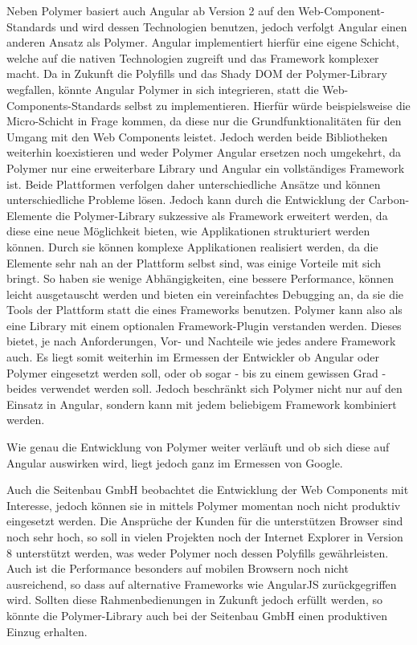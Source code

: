 Neben Polymer basiert auch Angular ab Version 2 auf den Web-Component-Stan\-dards und wird dessen Technologien benutzen, jedoch verfolgt Angular einen anderen Ansatz als Polymer. Angular implementiert hierfür eine eigene Schicht, welche auf die nativen Technologien zugreift und das Framework komplexer macht. Da in Zukunft die Polyfills und das Shady \ac{DOM} der Polymer-Library wegfallen, könnte Angular Polymer in sich integrieren, statt die Web-Components-Standards selbst zu implementieren. Hierfür würde beispielsweise die Micro-Schicht in Frage kommen, da diese nur die Grundfunktionalitäten für den Umgang mit den Web Components leistet. Jedoch werden beide Bibliotheken weiterhin koexistieren und weder Polymer Angular ersetzen noch umgekehrt, da Polymer nur eine erweiterbare Library und Angular ein vollständiges Framework ist. Beide Plattformen verfolgen daher unterschiedliche Ansätze und können unterschiedliche Probleme lösen. Jedoch kann durch die Entwicklung der Carbon-Elemente die Polymer-Library sukzessive als Framework erweitert werden, da diese eine neue Möglichkeit bieten, wie Applikationen strukturiert werden können. Durch sie können komplexe Applikationen realisiert werden, da die Elemente sehr nah an der Plattform selbst sind, was einige Vorteile mit sich bringt. So haben sie wenige Abhängigkeiten, eine bessere Performance, können leicht ausgetauscht werden und bieten ein vereinfachtes Debugging an, da sie die Tools der Plattform statt die eines Frameworks benutzen. Polymer kann also als eine Library mit einem optionalen Framework-Plugin verstanden werden. Dieses bietet, je nach Anforderungen, Vor- und Nachteile wie jedes andere Framework auch. Es liegt somit weiterhin im Ermessen der Entwickler ob Angular oder Polymer eingesetzt werden soll, oder ob sogar - bis zu einem gewissen Grad - beides verwendet werden soll. Jedoch beschränkt sich Polymer nicht nur auf den Einsatz in Angular, sondern kann mit jedem beliebigem Framework kombiniert werden.

Wie genau die Entwicklung von Polymer weiter verläuft und ob sich diese auf Angular auswirken wird, liegt jedoch ganz im Ermessen von Google.

Auch die Seitenbau GmbH beobachtet die Entwicklung der Web Components mit Interesse, jedoch können sie in mittels Polymer momentan noch nicht produktiv eingesetzt werden. Die Ansprüche der Kunden für die unterstützen Browser sind noch sehr hoch, so soll in vielen Projekten noch der Internet Explorer in Version 8 unterstützt werden, was weder Polymer noch dessen Polyfills gewährleisten. Auch ist die Performance besonders auf mobilen Browsern noch nicht ausreichend, so dass auf alternative Frameworks wie AngularJS zurückgegriffen wird. Sollten diese Rahmenbedienungen in Zukunft jedoch erfüllt werden, so könnte die Polymer-Library auch bei der Seitenbau GmbH einen produktiven Einzug erhalten.
